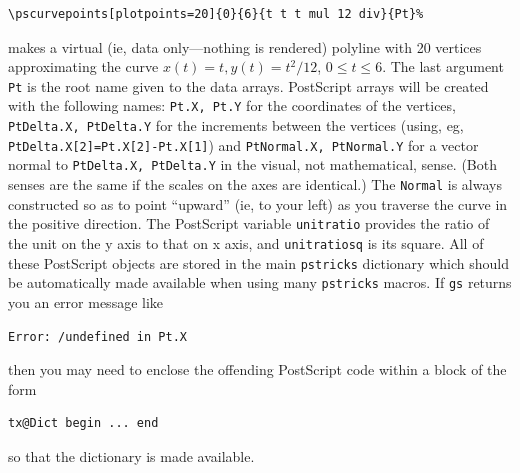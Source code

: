 \documentclass[11pt,english,BCOR=10mm,DIV=12,bibliography=totoc,parskip=false,headings=small,
    headinclude=false,footinclude=false,oneside]{pst-doc}
\begin{document}
\begin{verbatim}
\pscurvepoints[plotpoints=20]{0}{6}{t t t mul 12 div}{Pt}%
\end{verbatim}
makes a virtual (ie, data only---nothing is rendered) polyline with 20 vertices approximating 
the curve $x(t)=t, y(t)=t^2/12$, $0\le t\le 6$. The last argument \texttt{Pt} is the root name 
given to the data arrays.  PostScript arrays will be created with the following names: \texttt{Pt.X, Pt.Y} 
for the coordinates of the vertices, \texttt{PtDelta.X, PtDelta.Y} for the increments between the 
vertices (using, eg, \texttt{PtDelta.X[2]=Pt.X[2]-Pt.X[1]}) and \texttt{PtNormal.X, PtNormal.Y} for 
a vector normal to \texttt{PtDelta.X, PtDelta.Y} in the visual, not mathematical, sense. 
(Both senses are the same if the scales on the axes are identical.) The \texttt{Normal} is 
always constructed so as to point ``upward'' (ie, to your left) as you traverse the curve 
in the positive direction. The PostScript variable \texttt{unitratio} provides the ratio of 
the unit on the y axis to that on x axis, and \texttt{unitratiosq} is its square. All of 
these PostScript objects are stored in the main \texttt{pstricks} dictionary  
which should be automatically made available when using many \texttt{pstricks} macros. 
If \texttt{gs} returns you an error message like
\begin{verbatim}
Error: /undefined in Pt.X
\end{verbatim}
then you may need to enclose the offending PostScript code within a block of the form
\begin{verbatim}
tx@Dict begin ... end
\end{verbatim}
so that the dictionary is made available.
\end{document}
